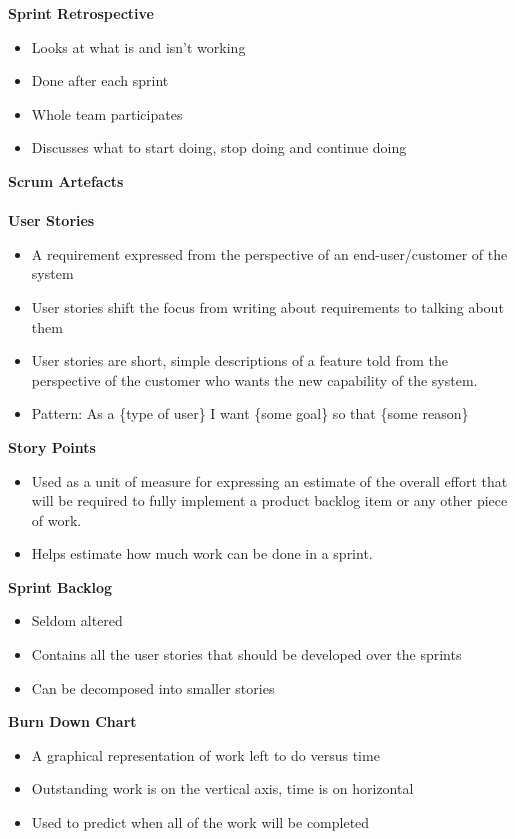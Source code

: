 \documentclass[a4paper,10pt]{article}
\begin{document}
\textbf{Sprint Retrospective}
\begin{itemize}
	\item Looks at what is and isn't working 
	\item Done after each sprint 
	\item Whole team participates 
	\item Discusses what to start doing, stop doing and continue doing\\ 
\end{itemize}
\textcolor{BlueGreen}{\textbf{Scrum Artefacts}}\\\\
\textbf{User Stories}
\begin{itemize}
	\item A requirement expressed from the perspective of an end-user/customer of the system
	\item User stories shift the focus from writing about requirements to talking about them 
	\item User stories are short, simple descriptions of a feature told from the perspective of the customer who wants the new capability of the system. 
	\item Pattern: As a \{type of user\} I want \{some goal\} so that \{some reason\} \\
\end{itemize}
\newpage
\noindent \textbf{Story Points}
\begin{itemize}
	\item Used as a unit of measure for expressing an estimate of the overall effort that will be required to fully implement a product backlog item or any other piece of work. 
	\item Helps estimate how much work can be done in a sprint. 
\end{itemize}
\textbf{Sprint Backlog}
\begin{itemize}
	\item Seldom altered 
	\item Contains all the user stories that should be developed over the sprints
	\item Can be decomposed into smaller stories 
\end{itemize}
\textbf{Burn Down Chart}
\begin{itemize}
	\item A graphical representation of work left to do versus time 
	\item Outstanding work is on the vertical axis, time is on horizontal 
	\item Used to predict when all of the work will be completed
\end{itemize}
\end{document}
